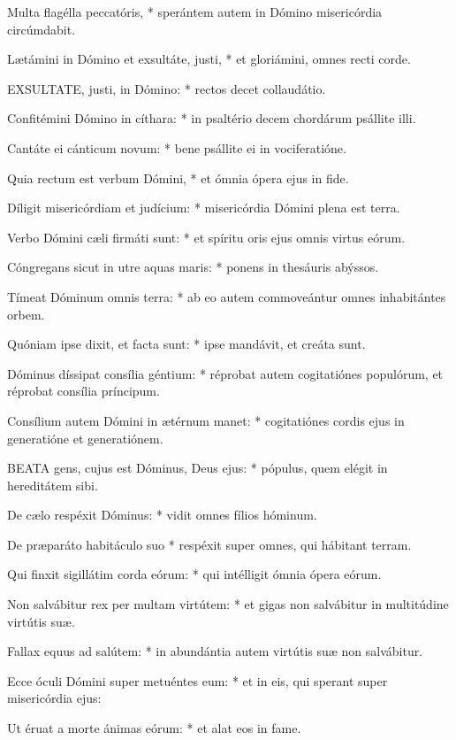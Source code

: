 Multa flagélla peccatóris, * sperántem autem in Dómino misericórdia circúmdabit.

Lætámini in Dómino et exsultáte, justi, * et gloriámini, omnes recti corde.


\lettrine[lines=2]{E}{XSULTATE}, justi, in Dómino: * rectos decet collaudátio.

Confitémini Dómino in cíthara: * in psaltério decem chordárum psállite illi.

Cantáte ei cánticum novum: * bene psállite ei in vociferatióne.

Quia rectum est verbum Dómini, * et ómnia ópera ejus in fide.

Díligit misericórdiam et judícium: * misericórdia Dómini plena est terra.

Verbo Dómini cæli firmáti sunt: * et spíritu oris ejus omnis virtus eórum.

Cóngregans sicut in utre aquas maris: * ponens in thesáuris abýssos.

Tímeat Dóminum omnis terra: * ab eo autem commoveántur omnes inhabitántes orbem.

Quóniam ipse dixit, et facta sunt: * ipse mandávit, et creáta sunt.

Dóminus díssipat consília géntium: * réprobat autem cogitatiónes populórum, et réprobat consília príncipum.

Consílium autem Dómini in ætérnum manet: * cogitatiónes cordis ejus in generatióne et generatiónem.


\lettrine[lines=2]{B}{EATA} gens, cujus est Dóminus, Deus ejus: * pópulus, quem elégit in hereditátem sibi.

De cælo respéxit Dóminus: * vidit omnes fílios hóminum.

De præparáto habitáculo suo * respéxit super omnes, qui hábitant terram.

Qui finxit sigillátim corda eórum: * qui intélligit ómnia ópera eórum.

Non salvábitur rex per multam virtútem: * et gigas non salvábitur in multitúdine virtútis suæ.

Fallax equus ad salútem: * in abundántia autem virtútis suæ non salvábitur.

Ecce óculi Dómini super metuéntes eum: * et in eis, qui sperant super misericórdia ejus:

Ut éruat a morte ánimas eórum: * et alat eos in fame.

